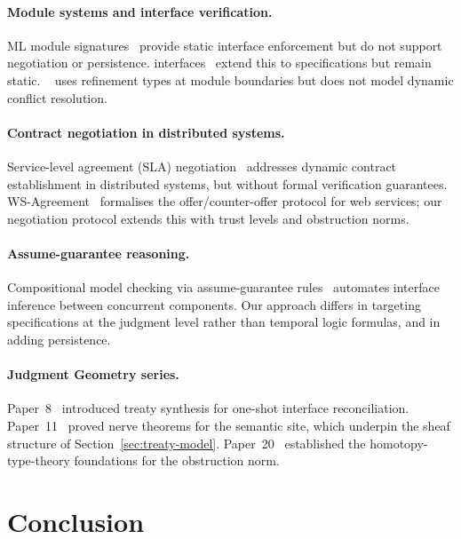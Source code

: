 \documentclass[11pt]{article}
\begin{document}
\paragraph{Module systems and interface verification.}
ML module signatures~\cite{milner1997,leroy1994} provide static
interface enforcement but do not support negotiation or persistence.
\Fstar{} interfaces~\cite{swamy2016} extend this to specifications
but remain static.  \Dafny~\cite{leino2010} uses refinement types
at module boundaries but does not model dynamic conflict resolution.

\paragraph{Contract negotiation in distributed systems.}
Service-level agreement (SLA) negotiation~\cite{keller2003} addresses
dynamic contract establishment in distributed systems, but without
formal verification guarantees.  WS-Agreement~\cite{andrieux2007}
formalises the offer/counter-offer protocol for web services; our
negotiation protocol extends this with trust levels and obstruction
norms.

\paragraph{Assume-guarantee reasoning.}
Compositional model checking via assume-guarantee rules~\cite{giannakopoulou2002}
automates interface inference between concurrent components.
Our approach differs in targeting specifications at the judgment
level rather than temporal logic formulas, and in adding persistence.

\paragraph{Judgment Geometry series.}
Paper~8~\cite{jugeo8} introduced treaty synthesis for one-shot
interface reconciliation.  Paper~11~\cite{jugeo11} proved nerve
theorems for the semantic site, which underpin the sheaf structure
of Section~\ref{sec:treaty-model}.  Paper~20~\cite{jugeo20}
established the homotopy-type-theory foundations for the
obstruction norm.

\section{Conclusion}\label{sec:conclusion}
\end{document}
